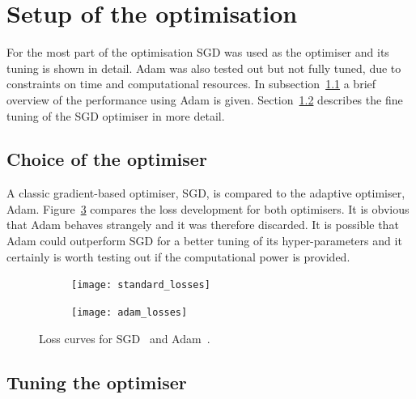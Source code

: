 \section{Setup of the optimisation}

For the most part of the optimisation SGD was used as the optimiser and its tuning is shown in detail.
Adam was also tested out but not fully tuned, due to constraints on time and computational resources.
In subsection~\ref{sec:optimiser:choice} a brief overview of the performance using Adam is given. Section~\ref{sec:optimiser:tuning} describes the fine tuning of the SGD optimiser in more detail.

\subsection{Choice of the optimiser}
\label{sec:optimiser:choice}

A classic gradient-based optimiser, SGD, is compared to the adaptive optimiser, Adam. Figure~\ref{fig:opti} compares the loss development for both optimisers. It is obvious that Adam behaves strangely and it was therefore discarded. It is possible that Adam could outperform SGD for a better tuning of its hyper-parameters and it certainly is worth testing out if the computational power is provided.

\begin{figure}[htbp]
    \centering
    \begin{subfigure}[b]{0.48\textwidth}
        \texttt{[image: standard\_losses]}
        \caption{}
        \label{fig:opti:standard}
    \end{subfigure}
\quad
    \begin{subfigure}[b]{0.48\textwidth}
        \texttt{[image: adam\_losses]}
        \caption{}
        \label{fig:opti:adam}
    \end{subfigure}
    \caption[Classifier losses for different optimisers]{Loss curves for SGD~ and Adam~.}
	\label{fig:opti}
\end{figure}

\subsection{Tuning the optimiser}
\label{sec:optimiser:tuning}

